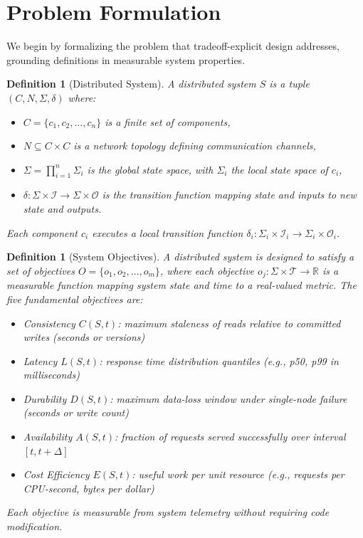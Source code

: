 \documentclass[conference]{IEEEtran}
\newtheorem{definition}[theorem]{Definition}
\begin{document}
\section{Problem Formulation}
\label{sec:problem}

We begin by formalizing the problem that tradeoff-explicit design addresses, grounding definitions in measurable system properties.

\begin{definition}[Distributed System]
A distributed system $S$ is a tuple $(C, N, \Sigma, \delta)$ where:
\begin{itemize}
    \item $C = \{c_1, c_2, \ldots, c_n\}$ is a finite set of components,
    \item $N \subseteq C \times C$ is a network topology defining communication channels,
    \item $\Sigma = \prod_{i=1}^n \Sigma_i$ is the global state space, with $\Sigma_i$ the local state space of $c_i$,
    \item $\delta: \Sigma \times \mathcal{I} \to \Sigma \times \mathcal{O}$ is the transition function mapping state and inputs to new state and outputs.
\end{itemize}
Each component $c_i$ executes a local transition function $\delta_i: \Sigma_i \times \mathcal{I}_i \to \Sigma_i \times \mathcal{O}_i$.
\end{definition}

\begin{definition}[System Objectives]
A distributed system is designed to satisfy a set of objectives $O = \{o_1, o_2, \ldots, o_m\}$, where each objective $o_j: \Sigma \times \mathcal{T} \to \mathbb{R}$ is a measurable function mapping system state and time to a real-valued metric. The five fundamental objectives are:
\begin{itemize}
    \item \textit{Consistency} $C(S,t)$: maximum staleness of reads relative to committed writes (seconds or versions)
    \item \textit{Latency} $L(S,t)$: response time distribution quantiles (e.g., p50, p99 in milliseconds)
    \item \textit{Durability} $D(S,t)$: maximum data-loss window under single-node failure (seconds or write count)
    \item \textit{Availability} $A(S,t)$: fraction of requests served successfully over interval $[t, t+\Delta]$
    \item \textit{Cost Efficiency} $E(S,t)$: useful work per unit resource (e.g., requests per CPU-second, bytes per dollar)
\end{itemize}
Each objective is measurable from system telemetry without requiring code modification.
\end{definition}
\end{document}
